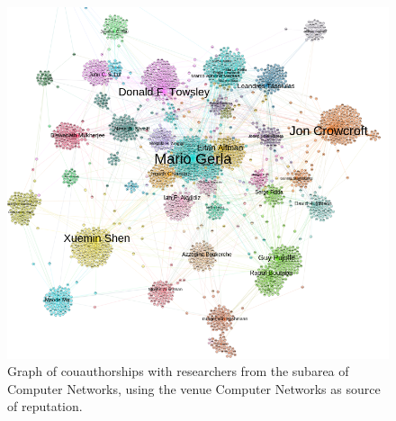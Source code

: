 \documentclass[msc]{ppgccufmg}
\begin{document}
\begin{appendices}
\begin{figure}[h]
    \centering
    \includegraphics[scale=0.45]{fig/cn}
    \caption{Graph of couauthorships with researchers from the subarea of Computer Networks, using the venue Computer Networks as source of reputation.}
    \label{fig:cn}
\end{figure}


\end{appendices}
\end{document}
